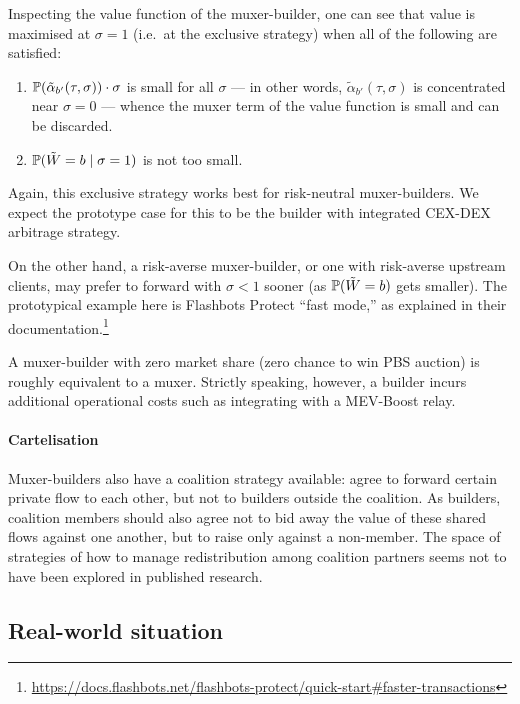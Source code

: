 Inspecting the value function of the muxer-builder, one can see that value is maximised at $\sigma=1$ (i.e.~at the exclusive strategy) when all of the following are satisfied:
%
\begin{enumerate}
  \item
    $\mathbb{P}(\tilde\alpha_{b'}(\tau,\sigma))\cdot\sigma$ is small for all $\sigma$ --- in other words, $\tilde\alpha_{b'}(\tau,\sigma)$ is concentrated near $\sigma=0$ --- whence the muxer term of the value function is small and can be discarded.
  \item
    $\mathbb{P}(\tilde{W}=b\mid\sigma=1)$ is not too small.
\end{enumerate}
%
Again, this exclusive strategy works best for risk-neutral muxer-builders.
%
We expect the prototype case for this to be the builder with integrated CEX-DEX arbitrage strategy.

On the other hand, a risk-averse muxer-builder, or one with risk-averse upstream clients, may prefer to forward with $\sigma<1$ sooner (as $\mathbb{P}(\tilde{W}=b)$ gets smaller).
%
The prototypical example here is Flashbots Protect ``fast mode,'' as explained in their documentation.\footnote{\url{https://docs.flashbots.net/flashbots-protect/quick-start\#faster-transactions}}

\begin{remark*}
  
    A muxer-builder with zero market share (zero chance to win PBS auction) is roughly equivalent to a muxer. 
    Strictly speaking, however, a builder incurs additional operational costs such as integrating with a MEV-Boost relay.

\end{remark*}


\paragraph{Cartelisation}

Muxer-builders also have a coalition strategy available: agree to forward certain private flow to each other, but not to builders outside the coalition.
%
As builders, coalition members should also agree not to bid away the value of these shared flows against one another, but to raise only against a non-member.
%
The space of strategies of how to manage redistribution among coalition partners seems not to have been explored in published research.

\subsection*{Real-world situation}

